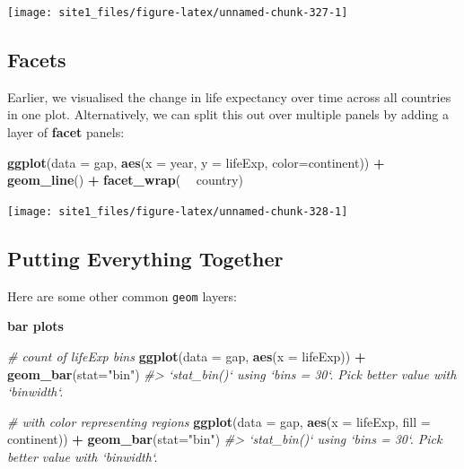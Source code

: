\documentclass[]{book}
\newenvironment{Shaded}{\begin{snugshade}}{\end{snugshade}}
\newcommand{\KeywordTok}[1]{\textcolor[rgb]{0.13,0.29,0.53}{\textbf{#1}}}
\newcommand{\DataTypeTok}[1]{\textcolor[rgb]{0.13,0.29,0.53}{#1}}
\newcommand{\StringTok}[1]{\textcolor[rgb]{0.31,0.60,0.02}{#1}}
\newcommand{\CommentTok}[1]{\textcolor[rgb]{0.56,0.35,0.01}{\textit{#1}}}
\newcommand{\OperatorTok}[1]{\textcolor[rgb]{0.81,0.36,0.00}{\textbf{#1}}}
\newcommand{\NormalTok}[1]{#1}
\begin{document}
\begin{center}\texttt{[image: site1\_files/figure-latex/unnamed-chunk-327-1]} \end{center}

\subsection{Facets}\label{facets}

Earlier, we visualised the change in life expectancy over time across
all countries in one plot. Alternatively, we can split this out over
multiple panels by adding a layer of \textbf{facet} panels:

\begin{Shaded}
\begin{Highlighting}[]
\KeywordTok{ggplot}\NormalTok{(}\DataTypeTok{data =}\NormalTok{ gap, }\KeywordTok{aes}\NormalTok{(}\DataTypeTok{x =}\NormalTok{ year, }\DataTypeTok{y =}\NormalTok{ lifeExp, }\DataTypeTok{color=}\NormalTok{continent)) }\OperatorTok{+}
\StringTok{  }\KeywordTok{geom_line}\NormalTok{() }\OperatorTok{+}\StringTok{ }
\StringTok{  }\KeywordTok{facet_wrap}\NormalTok{( }\OperatorTok{~}\StringTok{ }\NormalTok{country)}
\end{Highlighting}
\end{Shaded}

\begin{center}\texttt{[image: site1\_files/figure-latex/unnamed-chunk-328-1]} \end{center}

\subsection{Putting Everything
Together}\label{putting-everything-together}

Here are some other common \texttt{geom} layers:

\textbf{bar plots}

\begin{Shaded}
\begin{Highlighting}[]
\CommentTok{# count of lifeExp bins}
\KeywordTok{ggplot}\NormalTok{(}\DataTypeTok{data =}\NormalTok{ gap, }\KeywordTok{aes}\NormalTok{(}\DataTypeTok{x =}\NormalTok{ lifeExp)) }\OperatorTok{+}\StringTok{ }
\StringTok{  }\KeywordTok{geom_bar}\NormalTok{(}\DataTypeTok{stat=}\StringTok{"bin"}\NormalTok{)}
\CommentTok{#> `stat_bin()` using `bins = 30`. Pick better value with `binwidth`.}

\CommentTok{# with color representing regions}
\KeywordTok{ggplot}\NormalTok{(}\DataTypeTok{data =}\NormalTok{ gap, }\KeywordTok{aes}\NormalTok{(}\DataTypeTok{x =}\NormalTok{ lifeExp, }\DataTypeTok{fill =}\NormalTok{ continent)) }\OperatorTok{+}\StringTok{ }
\StringTok{  }\KeywordTok{geom_bar}\NormalTok{(}\DataTypeTok{stat=}\StringTok{"bin"}\NormalTok{)}
\CommentTok{#> `stat_bin()` using `bins = 30`. Pick better value with `binwidth`.}
\end{Highlighting}
\end{Shaded}
\end{document}
